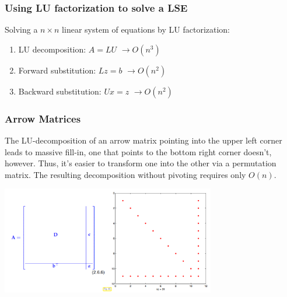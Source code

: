 \documentclass[12pt, a4paper]{article}
\begin{document}
\subsubsection{Using LU factorization to solve a LSE}
Solving a $n \times n$ linear system of equations by LU factorization:
\begin{enumerate}
	\item LU decomposition: \hspace{8mm} $A=LU$ \hspace{3mm} $\rightarrow O(n^3)$
	\item Forward substitution: \hspace{4mm} $Lz=b$ \hspace{5mm} $\rightarrow O(n^2)$
	\item Backward substitution: \hspace{2mm} $Ux=z$ \hspace{3mm} $\rightarrow O(n^2)$
\end{enumerate}


\subsubsection{Arrow Matrices}

The LU-decomposition of an arrow matrix pointing into the upper left corner leads to massive fill-in, one that points to the bottom right corner doesn't, however. Thus, it's easier to transform one into the other via a permutation matrix. The resulting decomposition without pivoting requires only $O(n)$.

\begin{center}
	\includegraphics[width=0.7\textwidth]{arrow_matrix.png}
\end{center}
\end{document}
